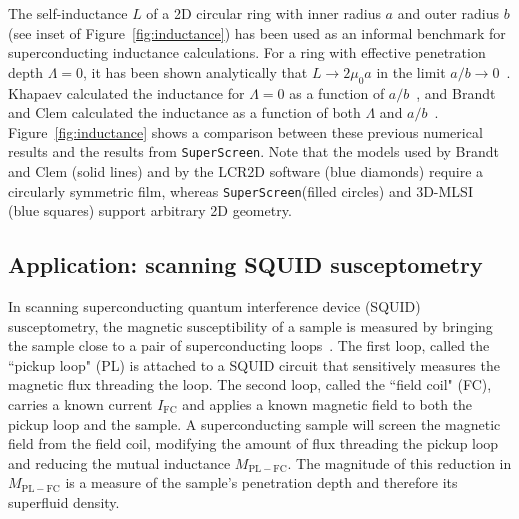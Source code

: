 \documentclass[final,3p,times,twocolumn]{elsarticle}
\newcommand{\inline}[1]{\texttt{#1}\xspace}
\newcommand{\SuperScreen}{\inline{SuperScreen}}
\begin{document}
The self-inductance $L$ of a 2D circular ring with inner radius $a$ and outer radius $b$ (see inset of Figure~\ref{fig:inductance}) has been used as an informal benchmark for superconducting inductance calculations. For a ring with effective penetration depth $\Lambda = 0$, it has been shown analytically that $L\to 2\mu_0 a$ in the limit $a/b\to 0$~\cite{Ketchen2012-mb, Babaei_Brojeny2003-la}. Khapaev calculated the inductance for $\Lambda = 0$ as a function of $a/b$~\cite{Khapaev1997-kw}, and Brandt and Clem calculated the inductance as a function of both $\Lambda$ and $a / b$~\cite{Brandt2004-ew}. Figure~\ref{fig:inductance} shows a comparison between these previous numerical results and the results from \SuperScreen. Note that the models used by Brandt and Clem (solid lines) and by the LCR2D software (blue diamonds) require a circularly symmetric film, whereas \SuperScreen (filled circles) and 3D-MLSI~\cite{Khapaev1997-kw, Khapaev2001-xq, Khapaev2001-pw} (blue squares) support arbitrary 2D geometry. 

\subsection{Application: scanning SQUID susceptometry}
\label{section:examples:scanning-squid}

In scanning superconducting quantum interference device (SQUID) susceptometry, the magnetic susceptibility of a sample is measured by bringing the sample close to a pair of superconducting loops~\cite{Gardner2001-gr, Huber2008-il, Kirtley_Kalisky_2012}. The first loop, called the ``pickup loop" (PL) is attached to a SQUID circuit that sensitively measures the magnetic flux threading the loop. The second loop, called the ``field coil" (FC), carries a known current $I_\mathrm{FC}$ and applies a known magnetic field to both the pickup loop and the sample. A superconducting sample will screen the magnetic field from the field coil, modifying the amount of flux threading the pickup loop and reducing the mutual inductance $M_\mathrm{PL-FC}$. The magnitude of this reduction in $M_\mathrm{PL-FC}$ is a measure of the sample's penetration depth and therefore its superfluid density.
\end{document}

